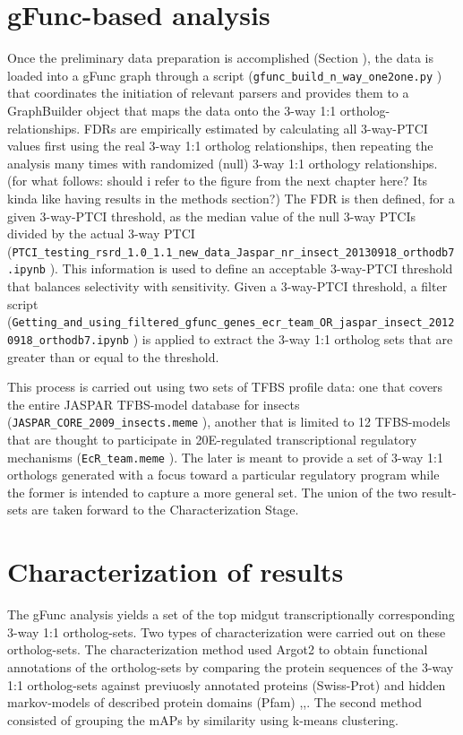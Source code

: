\section{gFunc-based analysis}
Once the preliminary data preparation is accomplished (Section \label{sec:prelim-data}), the data is loaded into a \gls{gFunc} graph through a script (\texttt{gfunc\_build\_n\_way\_one2one.py} \cite{Dunn2013dissSupl}) that coordinates the initiation of relevant parsers and provides them to a GraphBuilder object that maps the data onto the 3-way 1:1 ortholog-relationships.
\glspl{FDR} are empirically estimated by calculating all 3-way-\gls{PTCI} values first using the real 3-way 1:1 ortholog relationships, then repeating the analysis many times with randomized (null) 3-way 1:1 orthology relationships.
\alert{(for what follows: should i refer to the figure from the next chapter here?  Its kinda like having results in the methods section?)}
The \gls{FDR} is then defined, for a given 3-way-\gls{PTCI} threshold, as the median value of the null 3-way \glspl{PTCI} divided by the actual 3-way \gls{PTCI} (\texttt{PTCI\_testing\_rsrd\_1.0\_1.1\_new\_data\_Jaspar\_nr\_insect\_20130918\_orthodb7.ipynb} \cite{Dunn2013dissSupl}).
This information is used to define an acceptable 3-way-\gls{PTCI} threshold that balances selectivity with sensitivity.
Given a 3-way-\gls{PTCI} threshold, a filter script (\texttt{Getting\_and\_using\_filtered\_gfunc\_genes\_ecr\_team\_OR\_jaspar\_insect\_20120918\_orthodb7.ipynb} \cite{Dunn2013dissSupl}) is applied to extract the 3-way 1:1 ortholog sets that are greater than or equal to the threshold.

This process is carried out using two sets of \gls{TFBS} profile data: one that covers the entire JASPAR \gls{TFBS}-model database for insects (\texttt{JASPAR\_CORE\_2009\_insects.meme}  \cite{Dunn2013dissSupl}), another that is limited to 12 \gls{TFBS}-models that are thought to participate in \gls{20E}-regulated transcriptional regulatory mechanisms (\texttt{EcR\_team.meme} \cite{Dunn2013dissSupl}).
The later is meant to provide a set of 3-way 1:1 orthologs generated with a focus toward a particular regulatory program while the former is intended to capture a more general set.
The union of the two result-sets are taken forward to the Characterization Stage.



\section{Characterization of results}
The \gls{gFunc} analysis yields a set of the top midgut transcriptionally corresponding 3-way 1:1 ortholog-sets.
Two types of characterization were carried out on these ortholog-sets.
The characterization method used \gls{Argot2} to obtain functional annotations of the ortholog-sets by comparing the protein sequences of the 3-way 1:1 ortholog-sets against previuosly annotated proteins (\gls{Swiss-Prot}) and hidden markov-models of described protein domains (\gls{Pfam}) \cite{Boeckmann},\cite{Punta2012},\cite{Falda2012}.
The second method consisted of grouping the \glspl{mAP} by similarity using k-means clustering.

